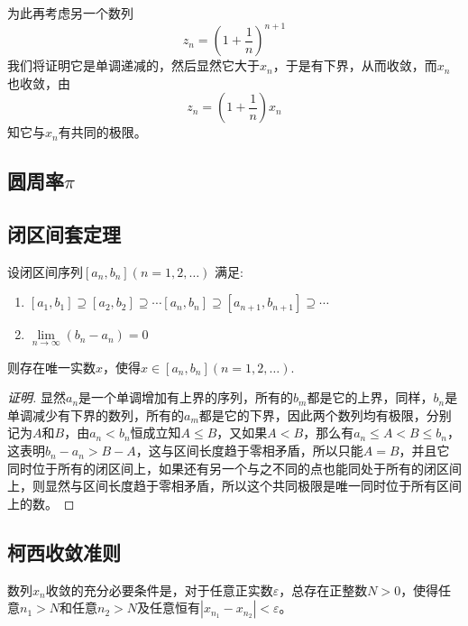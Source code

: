为此再考虑另一个数列
\[ z_n = \left( 1 + \frac{1}{n} \right)^{n+1} \]
我们将证明它是单调递减的，然后显然它大于$x_n$，于是有下界，从而收敛，而$x_n$也收敛，由
\[ z_n=\left( 1+\frac{1}{n} \right)x_n \]
知它与$x_n$有共同的极限。

\subsection{圆周率$\pi$}
\label{sec:pi}



\subsection{闭区间套定理}
\label{sec:theorem-of-closed-interval-sequence}

\begin{theorem}[闭区间套定理]
  \label{closed-interval-sequence-theorem}
  设闭区间序列$[a_n,b_n](n=1,2,\ldots)$ 满足:
  \begin{enumerate}
  \item $[a_1,b_1] \supseteq [a_2,b_2] \supseteq \cdots [a_n,b_n] \supseteq [a_{n+1},b_{n+1}] \supseteq \cdots$
  \item $\lim\limits_{n \to \infty} (b_n-a_n) = 0$
  \end{enumerate}
    则存在唯一实数$x$，使得$x \in [a_n,b_n](n=1,2,\ldots)$.
\end{theorem}

\begin{proof}[证明]
  显然$a_n$是一个单调增加有上界的序列，所有的$b_m$都是它的上界，同样，$b_n$是单调减少有下界的数列，所有的$a_m$都是它的下界，因此两个数列均有极限，分别记为$A$和$B$，由$a_n < b_n$恒成立知$A \leqslant B$，又如果$A<B$，那么有$a_n\leqslant A < B \leqslant b_n$，这表明$b_n-a_n>B-A$，这与区间长度趋于零相矛盾，所以只能$A=B$，并且它同时位于所有的闭区间上，如果还有另一个与之不同的点也能同处于所有的闭区间上，则显然与区间长度趋于零相矛盾，所以这个共同极限是唯一同时位于所有区间上的数。
\end{proof}

\subsection{柯西收敛准则}
\label{sec:cauchy-convergence-rule}

\begin{theorem}[柯西收敛准则]
  数列$x_n$收敛的充分必要条件是，对于任意正实数$\varepsilon$，总存在正整数$N>0$，使得任意$n_1>N$和任意$n_2>N$及任意恒有$|x_{n_1}-x_{n_2}| < \varepsilon$。
\end{theorem}

